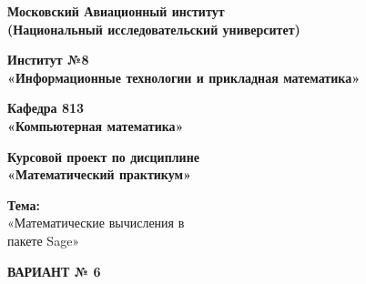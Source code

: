 \begin{titlepage}
\thispagestyle{empty}  %

\begin{center}
\textbf{
Московский Авиационный институт \\
(Национальный исследовательский университет)
}
\end{center}

\vspace{1em}
\begin{center}
\Large \textbf{ Институт №8 }\\
\large \textbf{ «Информационные технологии и прикладная математика» }\\
\end{center}

\vspace{0.5em}
\begin{center}
	\large \textbf {Кафедра 813 \\
	«Компьютерная математика» }\\
\end{center}

\vspace{0.5em}
\begin{center}
\large \textbf{Курсовой проект по дисциплине \\
«Математический практикум»\\}
\end{center}

\vspace{0.5em}
\begin{center}
	\Large \textbf{ Тема:}\\
	\large«Математические вычисления в \\
	пакете Sage»
\end{center}

\vspace{1em}
\begin{center}
\Large \textbf{ВАРИАНТ № 6}\\
\end{center}


\end{titlepage}
